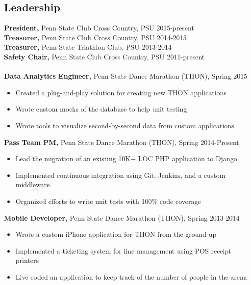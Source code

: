 \documentclass[margin]{res}
\begin{document}
\begin{resume}
\section{Leadership}
{\bf President,} Penn State Club Cross Country, PSU \hfill 2015-present \\
{\bf Treasurer,} Penn State Club Cross Country, PSU \hfill 2014-2015 \\
{\bf Treasurer,} Penn State Triathlon Club, PSU \hfill 2013-2014 \\
{\bf Safety Chair,} Penn State Club Cross Country, PSU \hfill 2011-present \\ \\
{\bf Data Analytics Engineer,} Penn State Dance Marathon (THON), \hfill Spring 2015
\begin{itemize} \itemsep -2pt %
\item Created a plug-and-play solution for creating new THON applications
\item Wrote custom mocks of the database to help unit testing
\item Wrote tools to visualize second-by-second data from custom applications
\end{itemize}
{\bf Pass Team PM,} Penn State Dance Marathon (THON), \hfill Spring 2014-Present
\begin{itemize} \itemsep -2pt %
\item Lead the migration of an existing 10K+ LOC PHP application to Django
\item Implemented continuous integration using Git, Jenkins, and a custom middleware
\item Organized efforts to write unit tests with 100\% code coverage
\end{itemize}
{\bf Mobile Developer,} Penn State Dance Marathon (THON), \hfill Spring 2013-2014
\begin{itemize} \itemsep -2pt %
\item Wrote a custom iPhone application for THON from the ground up
\item Implemented a ticketing system for line management using POS receipt printers
\item Live coded an application to keep track of the number of people in the arena
\end{itemize}


\end{resume}
\end{document}

